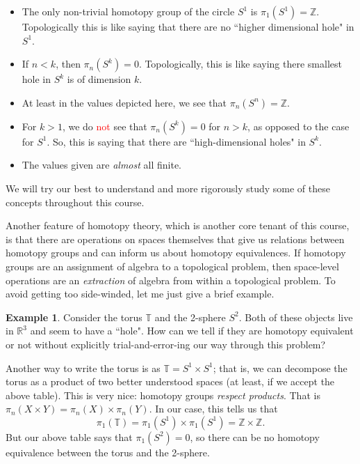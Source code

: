 \documentclass[10pt]{amsart}
\theoremstyle{definition}
\newtheorem{ex}[thm]{Example}
\begin{document}
\begin{itemize}
    \item The only non-trivial homotopy group of the circle $S^1$ is $\pi_1(S^1) = \mathbb{Z}$. Topologically this is like saying that there are no ``higher dimensional hole" in $S^1$.
    \item If $n <k$, then $\pi_n(S^k) =0$. Topologically, this is like saying there smallest hole in $S^k$ is of dimension $k$.
    \item At least in the values depicted here, we see that $\pi_n(S^n)=\mathbb{Z}.$
    \item For $k>1$, we do \textcolor{red}{not} see that $\pi_n(S^k)=0$ for $n>k$, as opposed to the case for $S^1$. So, this is saying that there are ``high-dimensional holes" in $S^k$.
    \item The values given are \emph{almost} all finite.
\end{itemize}
We will try our best to understand and more rigorously study some of these concepts throughout this course.

Another feature of homotopy theory, which is another core tenant of this course, is that there are operations on spaces themselves that give us relations between homotopy groups and can inform us about homotopy equivalences. If homotopy groups are an assignment of algebra to a topological problem, then space-level operations are an \emph{extraction} of algebra from within a topological problem. To avoid getting too side-winded, let me just give a brief example.

\begin{ex}
    Consider the torus $\mathbb{T}$ and the 2-sphere $S^2$. Both of these objects live in $\mathbb{R}^3$ and seem to have a ``hole". How can we tell if they are homotopy equivalent or not without explicitly trial-and-error-ing our way through this problem? 

    Another way to write the torus is as $\mathbb{T} = S^1 \times S^1$; that is, we can decompose the torus as a product of two better understood spaces (at least, if we accept the above table). This is very nice: homotopy groups \emph{respect products}. That is $\pi_n(X \times Y) = \pi_n(X) \times \pi_n(Y)$. In our case, this tells us that
    \[\pi_1(\mathbb{T}) = \pi_1(S^1) \times \pi_1(S^1) = \mathbb{Z} \times \mathbb{Z}.\]
    But our above table says that $\pi_1(S^2)=0$, so there can be no homotopy equivalence between the torus and the 2-sphere.
\end{ex}
\end{document}
